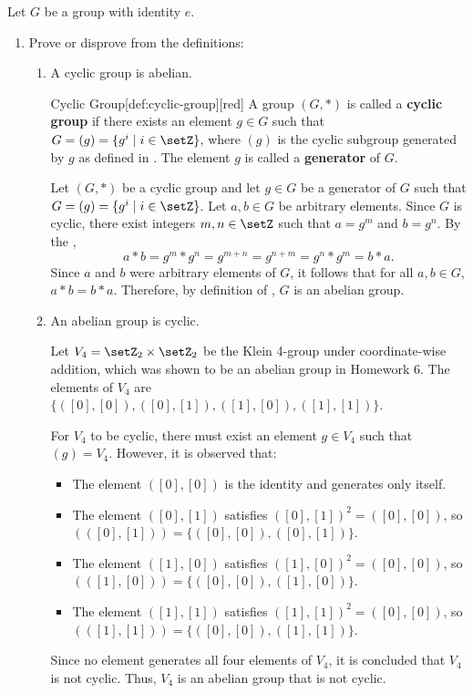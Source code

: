 \newpage
Let $G$ be a group with identity $e$.
\begin{enumerate}
  \item Prove or disprove from the definitions:
  \begin{enumerate}
    \item A cyclic group is abelian.
    \begin{define}{Cyclic Group}[def:cyclic-group][red]
      A group $(G, *)$ is called a \textbf{cyclic group} if there exists an element $g \in G$ such that $G = (g) = \{g^i \mid i \in \setZ\}$, 
      where $(g)$ is the cyclic subgroup generated by $g$ as defined in . 
      The element $g$ is called a \textbf{generator} of $G$.
    \end{define}
    \begin{subprove}
      Let $(G, *)$ be a cyclic group and let $g \in G$ be a generator of $G$ such that $G = (g) = \{g^i \mid i \in \setZ\}$.
      Let $a, b \in G$ be arbitrary elements.
      Since $G$ is cyclic, there exist integers $m, n \in \setZ$ such that $a = g^m$ and $b = g^n$.
      By the ,
      \[
        a * b = g^m * g^n = g^{m+n} = g^{n+m} = g^n * g^m = b * a.
      \]
      Since $a$ and $b$ were arbitrary elements of $G$, it follows that for all $a, b \in G$, $a * b = b * a$.
      Therefore, by definition of , $G$ is an abelian group.
    \end{subprove}
    \item An abelian group is cyclic.
    \begin{subdisprove}
      Let $V_4 = \setZ_2 \times \setZ_2$ be the Klein 4-group under coordinate-wise addition, 
      which was shown to be an abelian group in Homework 6.
      The elements of $V_4$ are $\{([0],[0]), ([0],[1]), ([1],[0]), ([1],[1])\}$.
      
      For $V_4$ to be cyclic, there must exist an element $g \in V_4$ such that $(g) = V_4$.
      However, it is observed that:
      \begin{itemize}
        \item The element $([0],[0])$ is the identity and generates only itself.
        \item The element $([0],[1])$ satisfies $([0],[1])^2 = ([0],[0])$, so $( ([0],[1]) ) = \{([0],[0]), ([0],[1])\}$.
        \item The element $([1],[0])$ satisfies $([1],[0])^2 = ([0],[0])$, so $( ([1],[0]) ) = \{([0],[0]), ([1],[0])\}$.
        \item The element $([1],[1])$ satisfies $([1],[1])^2 = ([0],[0])$, so $( ([1],[1]) ) = \{([0],[0]), ([1],[1])\}$.
      \end{itemize}
      Since no element generates all four elements of $V_4$, it is concluded that $V_4$ is not cyclic.
      Thus, $V_4$ is an abelian group that is not cyclic.
      

\end{subdisprove}
\end{enumerate}
\end{enumerate}

